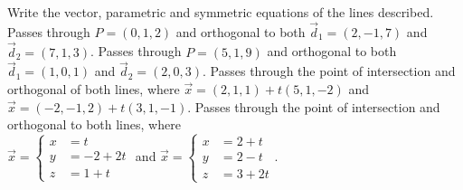 
\begin{Exercise}[
name={},
title={}, 
difficulty=0,
origin={\cite{GHC}}]
Write the vector, parametric and symmetric equations of the lines described.
\Question Passes through $P=(0,1,2)$ and orthogonal to both $\vec d_1=(2,-1,7)$ and $\vec d_2=(7,1,3)$.
\Question Passes through $P=(5,1,9)$ and orthogonal to both $\vec d_1=(1,0,1)$ and $\vec d_2=(2,0,3)$.
\Question Passes through the point of intersection and orthogonal of both lines, where
$\vec x = (2,1,1) + t(5,1,-2)$ and \\$\vec x = (-2,-1,2)+t(3,1,-1)$.
\Question Passes through the point of intersection and orthogonal to both lines, where\\
$\vec x = \left\{\begin{aligned} x&=t\\y&=-2+2t\\z&=1+t\end{aligned}\right.$ \quad and \quad 
$\vec x = \left\{\begin{aligned} x&=2+t\\y&=2-t\\z&=3+2t\end{aligned}\right.$.
\end{Exercise}
